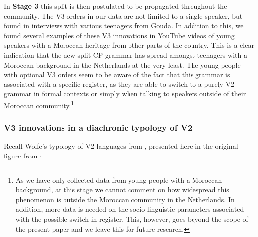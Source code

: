 \documentclass[output=paper]{langsci/langscibook}
\begin{document}
In \textbf{Stage 3} this split is then postulated to be propagated throughout
the community. The V3 orders in our data are not limited to a
single speaker, but found in interviews with various teenagers from Gouda. In
addition to this, we found several examples of these V3
innovations in YouTube videos of young speakers with a Moroccan heritage from
other parts of the country. This is a clear indication that the new split-CP
grammar has spread amongst teenagers with a Moroccan background in the
Netherlands at the very least. The young people with optional V3 orders seem to be aware of the fact that this grammar is associated with
a specific register, as they are able to switch to a purely V2 grammar in
formal contexts or simply when talking to  speakers outside of their
Moroccan  community.\footnote{As we have only collected data from
    young people with a Moroccan background, at this stage we cannot comment on
    how widespread this phenomenon is outside the Moroccan community in the
Netherlands. In addition, more data is needed on the socio-linguistic
parameters associated with the possible switch in register. This, however, goes
beyond the scope of the present paper and we leave this for future research.}

\subsubsection{V3 innovations in a diachronic typology of V2}

Recall Wolfe's typology of V2 languages from , presented here in
the original figure from \textcite[31]{Wolfe:2017}:
\end{document}
